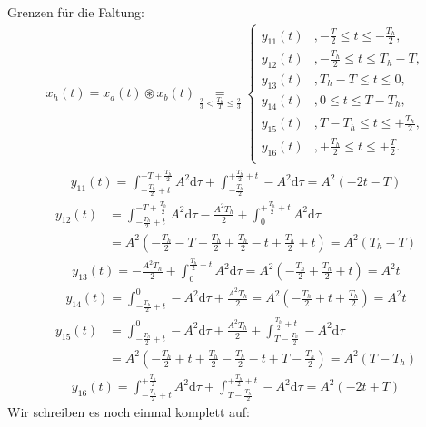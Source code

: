 \documentclass[11pt,a4paper,DIV=12]{scrartcl}
\newcommand{\diff}{\mathrm{d}}
\begin{document}
Grenzen für die Faltung:
%
%
\begin{align}
	x_{h}(t)=x_{a}(t)\circledast x_{b}(t)
	\underset{\frac{2}{3}<\frac{T_h}{T}\leq\frac{2}{3}}{=}
	\begin{cases}
		y_{11}(t)&,-\frac{T}{2}\leq t \leq -\frac{T_h}{2}, \\
		y_{12}(t)&,-\frac{T_h}{2}\leq t \leq T_h-T, \\
		y_{13}(t)&,T_h-T\leq t \leq 0, \\
		y_{14}(t)&,0\leq t \leq T-T_h, \\
		y_{15}(t)&,T-T_h\leq t \leq +\frac{T_h}{2}, \\
		y_{16}(t)&,+\frac{T_h}{2}\leq t \leq +\frac{T}{2}. \\
	\end{cases}
\end{align}
%
%
\begin{align}
	y_{11}(t)=\int_{-\frac{T_h}{2}+t}^{-T+\frac{T_h}{2}}A^2\diff \tau+\int_{-\frac{T_h}{2}}^{+\frac{T_h}{2}+t}-A^2\diff \tau=A^2(-2t-T)
\end{align}
%
%
\begin{align}
	y_{12}(t)&=\int_{-\frac{T_h}{2}+t}^{-T+\frac{T_h}{2}}A^2\diff \tau-\frac{A^2T_h}{2}+\int_0^{+\frac{T_h}{2}+t}A^2\diff \tau\nonumber \\
	&=A^2\left(-\frac{T_h}{2}-T+\frac{T_h}{2}+\frac{T_h}{2}-t+\frac{T_h}{2}+t\right)=A^2(T_h-T)
\end{align}
%
%
\begin{align}
	y_{13}(t)=-\frac{A^2T_h}{2}+\int_0^{\frac{T_h}{2}+t}A^2\diff \tau=A^2\left(-\frac{T_h}{2}+\frac{T_h}{2}+t\right)=A^2t
\end{align}
%
%
\begin{align}
	y_{14}(t)=\int_{-\frac{T_h}{2}+t}^{0}-A^2\diff \tau+\frac{A^2T_h}{2}=A^2\left(-\frac{T_h}{2}+t+\frac{T_h}{2}\right)=A^2t
\end{align}
%
%
\begin{align}
	y_{15}(t)&=\int_{-\frac{T_h}{2}+t}^0-A^2\diff \tau+\frac{A^2T_h}{2}+\int_{T-\frac{T_h}{2}}^{\frac{T_h}{2}+t}-A^2\diff \tau\nonumber \\
	&=A^2\left(-\frac{T_h}{2}+t+\frac{T_h}{2}-\frac{T_h}{2}-t+T-\frac{T_h}{2}\right)=A^2(T-T_h)
\end{align}
%
%
\begin{align}
	y_{16}(t)=\int_{-\frac{T_h}{2}+t}^{+\frac{T_h}{2}}A^2\diff \tau+\int_{T-\frac{T_h}{2}}^{+\frac{T_h}{2}+t}-A^2\diff \tau=A^2(-2t+T)
\end{align}
%
%
Wir schreiben es noch einmal komplett auf:
\end{document}
